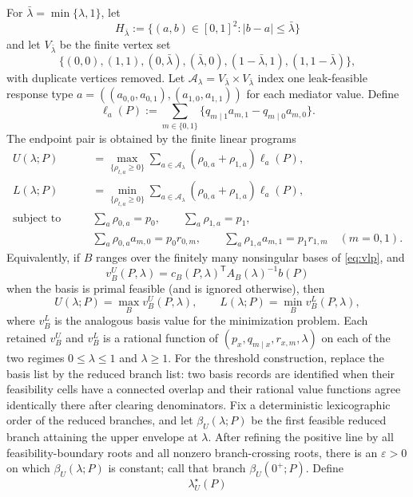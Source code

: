 \begin{theorem}
For $\bar\lambda=\min\{\lambda,1\}$, let
\[
  H_{\bar\lambda}
  :=\{(a,b)\in[0,1]^2: |b-a|\le \bar\lambda\}
\]
and let $V_{\bar\lambda}$ be the finite vertex set
\[
  \{(0,0),(1,1),(0,\bar\lambda),(\bar\lambda,0),(1-\bar\lambda,1),(1,1-\bar\lambda)\},
\]
with duplicate vertices removed. Let $\mathcal A_{\lambda}=V_{\bar\lambda}\times V_{\bar\lambda}$ index one
leak-feasible response type $a=((a_{0,0},a_{0,1}),(a_{1,0},a_{1,1}))$ for each mediator value. Define
\[
  \ell_a(P):=\sum_{m\in\{0,1\}}\{q_{m\mid1}a_{m,1}-q_{m\mid0}a_{m,0}\}.
\]
The endpoint pair is obtained by the finite linear programs
\begin{equation}
\begin{aligned}
  U(\lambda;P)
  &=\max_{\{\rho_{t,a}\ge0\}}\sum_{a\in\mathcal A_\lambda}
      (\rho_{0,a}+\rho_{1,a})\ell_a(P),\\
  L(\lambda;P)
  &=\min_{\{\rho_{t,a}\ge0\}}\sum_{a\in\mathcal A_\lambda}
      (\rho_{0,a}+\rho_{1,a})\ell_a(P),\\
  \text{subject to}\qquad
  &\sum_a\rho_{0,a}=p_0,\qquad
    \sum_a\rho_{1,a}=p_1,\\
  &\sum_a\rho_{0,a}a_{m,0}=p_0r_{0,m},\qquad
    \sum_a\rho_{1,a}a_{m,1}=p_1r_{1,m}\quad(m=0,1).
\end{aligned}
\tag{VLP}\label{eq:vlp}
\end{equation}
Equivalently, if $B$ ranges over the finitely many nonsingular bases of \eqref{eq:vlp}, and
\[
  v_B^U(P,\lambda)=c_B(P,\lambda)^\mathsf{T}A_B(\lambda)^{-1}b(P)
\]
when the basis is primal feasible (and is ignored otherwise), then
\[
  U(\lambda;P)=\max_{B}v_B^U(P,\lambda),\qquad
  L(\lambda;P)=\min_B v_B^L(P,\lambda),
\]
where $v_B^L$ is the analogous basis value for the minimization problem. Each retained $v_B^U$ and $v_B^L$ is
a rational function of $(p_x,q_{m\mid x},r_{x,m},\lambda)$ on each of the two regimes $0\le\lambda\le1$ and
$\lambda\ge1$. For the threshold construction, replace the basis list by the reduced branch list: two basis
records are identified when their feasibility cells have a connected overlap and their rational value functions
agree identically there after clearing denominators. Fix a deterministic lexicographic order of the reduced
branches, and let $\beta_U(\lambda;P)$ be the first feasible reduced branch attaining the upper envelope at
$\lambda$. After refining the positive line by all feasibility-boundary roots and all nonzero branch-crossing
roots, there is an $\varepsilon>0$ on which $\beta_U(\lambda;P)$ is constant; call that branch
$\beta_U(0^+;P)$. Define
\[
  \lambda_U^\star(P)
\]
\end{theorem}
